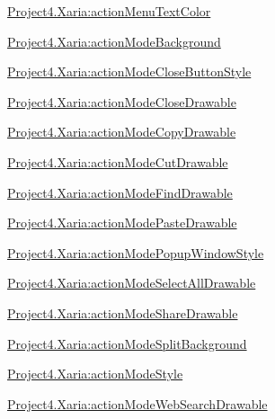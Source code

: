 {\ttfamily \hyperlink{classproject4_1_1xaria_1_1R_1_1styleable_a3a86c177d90451263e2f960e5e8dd93f}{Project4.\+Xaria\+:action\+Menu\+Text\+Color}}

{\ttfamily \hyperlink{classproject4_1_1xaria_1_1R_1_1styleable_a1456e2fb73b019f4b692d2ba615b5933}{Project4.\+Xaria\+:action\+Mode\+Background}}

{\ttfamily \hyperlink{classproject4_1_1xaria_1_1R_1_1styleable_a8f8cf06f9ecf3ab9f45c305f87f20707}{Project4.\+Xaria\+:action\+Mode\+Close\+Button\+Style}}

{\ttfamily \hyperlink{classproject4_1_1xaria_1_1R_1_1styleable_a2985c0df6c42837198bb3acd6f1017e8}{Project4.\+Xaria\+:action\+Mode\+Close\+Drawable}}

{\ttfamily \hyperlink{classproject4_1_1xaria_1_1R_1_1styleable_a22f8d7130857992c2c71953f7ab16efb}{Project4.\+Xaria\+:action\+Mode\+Copy\+Drawable}}

{\ttfamily \hyperlink{classproject4_1_1xaria_1_1R_1_1styleable_aaaa9698521dccac48903def6aa3f1607}{Project4.\+Xaria\+:action\+Mode\+Cut\+Drawable}}

{\ttfamily \hyperlink{classproject4_1_1xaria_1_1R_1_1styleable_a583749c75ba069fcac9c2290f3422f99}{Project4.\+Xaria\+:action\+Mode\+Find\+Drawable}}

{\ttfamily \hyperlink{classproject4_1_1xaria_1_1R_1_1styleable_a39092e8a0c13ec2bfb8555ab61ff14d1}{Project4.\+Xaria\+:action\+Mode\+Paste\+Drawable}}

{\ttfamily \hyperlink{classproject4_1_1xaria_1_1R_1_1styleable_a417ee14da32163c43ef73a9115b2a4e8}{Project4.\+Xaria\+:action\+Mode\+Popup\+Window\+Style}}

{\ttfamily \hyperlink{classproject4_1_1xaria_1_1R_1_1styleable_aff61e2a5924190bb7479ef2b13c8c7c0}{Project4.\+Xaria\+:action\+Mode\+Select\+All\+Drawable}}

{\ttfamily \hyperlink{classproject4_1_1xaria_1_1R_1_1styleable_ac049b8452b5594eff2fe1f6122e11e61}{Project4.\+Xaria\+:action\+Mode\+Share\+Drawable}}

{\ttfamily \hyperlink{classproject4_1_1xaria_1_1R_1_1styleable_a9e837df09f706dbb1c0d790a493f48ba}{Project4.\+Xaria\+:action\+Mode\+Split\+Background}}

{\ttfamily \hyperlink{classproject4_1_1xaria_1_1R_1_1styleable_aa1cbbb6e6f07e19dfc6810cf2e89f0f0}{Project4.\+Xaria\+:action\+Mode\+Style}}

{\ttfamily \hyperlink{classproject4_1_1xaria_1_1R_1_1styleable_a018f76fc0960147c4ef1591a74a324cc}{Project4.\+Xaria\+:action\+Mode\+Web\+Search\+Drawable}}

